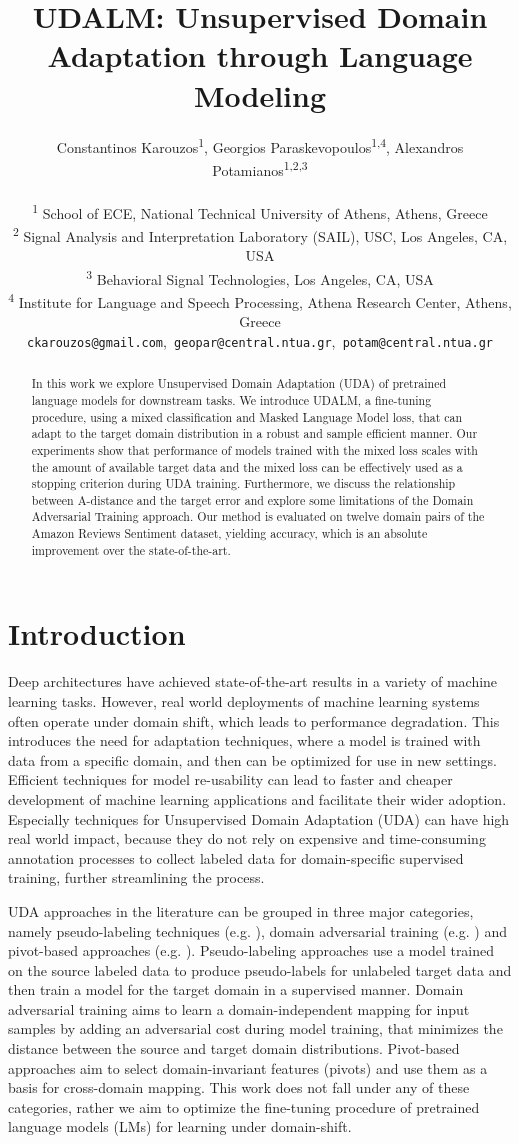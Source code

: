 \documentclass[11pt]{article}
\title{UDALM: Unsupervised Domain Adaptation through Language Modeling}
\author{Constantinos Karouzos\textsuperscript{1},
        Georgios Paraskevopoulos\textsuperscript{1,4}, 
        Alexandros Potamianos\textsuperscript{1,2,3} \\
\\
  \textsuperscript{1} School of ECE, National Technical University of Athens, Athens, Greece \\
  \textsuperscript{2} Signal Analysis and Interpretation Laboratory (SAIL), USC, Los Angeles, CA, USA \\
  \textsuperscript{3} Behavioral Signal Technologies, Los Angeles, CA, USA \\
    \textsuperscript{4} Institute for Language and Speech Processing, Athena Research Center, Athens, Greece \\
  \texttt{ckarouzos@gmail.com},\texttt{ geopar@central.ntua.gr},\texttt{ potam@central.ntua.gr}}
\begin{document}
\maketitle
\begin{abstract}
In this work we explore Unsupervised Domain Adaptation (UDA) of pretrained language models for downstream tasks.
We introduce UDALM, a fine-tuning procedure, using a mixed classification and Masked Language Model loss, that can adapt to the target domain distribution in a robust and sample efficient manner.
Our experiments show that performance of models trained with the mixed loss scales with the amount of available target data and the mixed loss can be effectively used as a stopping criterion during UDA training.
Furthermore, we discuss the relationship between A-distance and the target error and explore some limitations of the Domain Adversarial Training approach.
Our method is evaluated on twelve domain pairs of the Amazon Reviews Sentiment dataset, yielding  accuracy, which is an  absolute improvement over the state-of-the-art.
\end{abstract}

\section{Introduction}

Deep architectures have achieved state-of-the-art results in a variety of machine learning tasks.
However, real world deployments of machine learning systems often operate under domain shift, which leads to performance degradation.
This introduces the need for adaptation techniques, where a model is trained with data from a specific domain, and then can be optimized for use in new settings.
Efficient techniques for model re-usability can lead to faster and cheaper development of machine learning applications and facilitate their wider adoption.
Especially techniques for Unsupervised Domain Adaptation (UDA) can have high real world impact, because they do not rely on expensive and time-consuming annotation processes to collect labeled data for domain-specific supervised training, further streamlining the process.


UDA approaches in the literature can be grouped in three major categories, namely pseudo-labeling techniques (e.g. \citealp{yarowsky-1995-unsupervised, zhou2005tri}), domain adversarial training (e.g. \citealp{ganin2016domain}) and pivot-based approaches (e.g. \citealp{blitzer-etal-2006-domain, pan2010cross}). Pseudo-labeling approaches use a model trained on the source labeled data to produce pseudo-labels for unlabeled target data and then train a model for the target domain in a supervised manner. Domain adversarial training aims to learn a domain-independent mapping for input samples by adding an adversarial cost during model training, that minimizes the distance between the source and target domain distributions. Pivot-based approaches aim to select domain-invariant features (pivots) and use them as a basis for cross-domain mapping.
This work does not fall under any of these categories, rather we aim to optimize the fine-tuning procedure of pretrained language models (LMs) for learning under domain-shift.
\end{document}
